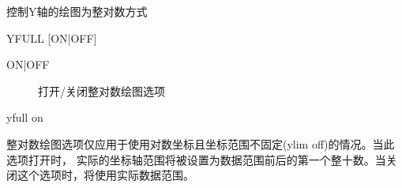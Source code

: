 \label{cmd:yfull}

控制Y轴的绘图为整对数方式

\begin{SACSTX}
YFULL [ON|OFF]
\end{SACSTX}

\begin{description}
\item [ON|OFF] 打开/关闭整对数绘图选项
\end{description}

\begin{SACDFT}
yfull on
\end{SACDFT}

整对数绘图选项仅应用于使用对数坐标且坐标范围不固定(ylim off)的情况。当此选项打开时，
实际的坐标轴范围将被设置为数据范围前后的第一个整十数。当关闭这个选项时，将使用实际数据范围。


